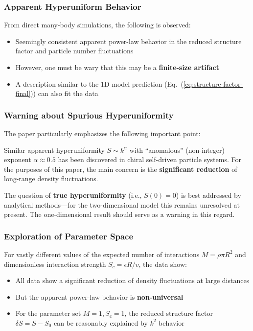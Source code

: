 \subsubsection{Apparent Hyperuniform Behavior}

From direct many-body simulations, the following is observed:
\begin{itemize}
    \item Seemingly consistent apparent power-law behavior in the reduced structure factor and particle number fluctuations
    \item However, one must be wary that this may be a \textbf{finite-size artifact}
    \item A description similar to the 1D model prediction (Eq.~(\ref{eq:structure-factor-final})) can also fit the data
\end{itemize}

\subsubsection{Warning about Spurious Hyperuniformity}

The paper particularly emphasizes the following important point:

\begin{notebox}
Similar apparent hyperuniformity $S \sim k^\alpha$ with ``anomalous'' (non-integer) exponent $\alpha \approx 0.5$ has been discovered in chiral self-driven particle systems. For the purposes of this paper, the main concern is the \textbf{significant reduction} of long-range density fluctuations.

The question of \textbf{true hyperuniformity} (i.e., $S(0) = 0$) is best addressed by analytical methods---for the two-dimensional model this remains unresolved at present. The one-dimensional result should serve as a warning in this regard.
\end{notebox}

\subsubsection{Exploration of Parameter Space}

For vastly different values of the expected number of interactions $M = \rho\pi R^2$ and dimensionless interaction strength $S_c = \epsilon R/v$, the data show:
\begin{itemize}
    \item All data show a significant reduction of density fluctuations at large distances
    \item But the apparent power-law behavior is \textbf{non-universal}
    \item For the parameter set $M = 1, S_c = 1$, the reduced structure factor $\delta S = S - S_0$ can be reasonably explained by $k^2$ behavior
\end{itemize}


